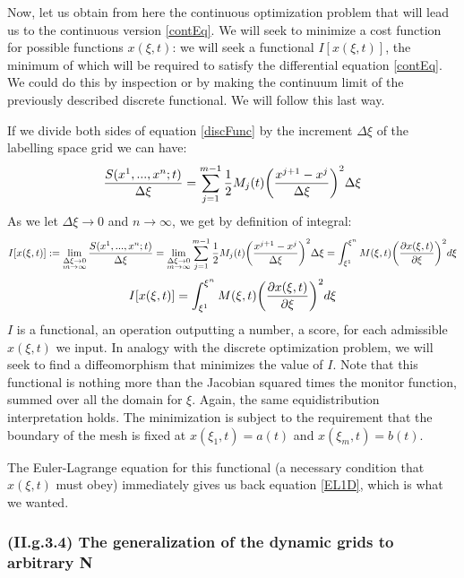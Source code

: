 \documentclass[11pt, a4paper]{article} %
\begin{document}
Now, let us obtain from here the continuous optimization problem that will lead us to the continuous version \eqref{contEq}. We will seek to minimize a cost function for possible functions $x(\xi,t)$: we will seek a functional $I[x(\xi,t)]$, the minimum of which will be required to satisfy the differential equation \eqref{contEq}. We could do this by inspection or by making the continuum limit of the previously described discrete functional. We will follow this last way.

If we divide both sides of equation \eqref{discFunc} by the increment $\Delta \xi$ of the labelling space grid we can have:
\begin{equation}
\frac{S( x^1,...,x^n;t)}{\Delta\xi}=\sum_{j=1}^{m-1} \frac{1}{2} M_j(t) \qty(\frac{x^{j+1}-x^j}{\Delta \xi})^2 \Delta \xi
\end{equation}
As we let $\Delta \xi \rightarrow 0$ and $n\rightarrow \infty$, we get by definition of integral:
\begin{equation}
I[x(\xi,t)]:=\lim\limits_{\substack{\Delta \xi \rightarrow 0\\ m \rightarrow \infty}}\frac{S( x^1,...,x^n;t)}{\Delta\xi}=\lim\limits_{\substack{\Delta \xi \rightarrow 0\\ m \rightarrow \infty}} \sum_{j=1}^{m-1}\frac{1}{2} M_j(t) \qty(\frac{x^{j+1}-x^j}{\Delta \xi})^2 \Delta \xi=\int_{\xi^1}^{\xi^n} M(\xi,t) \qty(\pdv{x(\xi,t)}{\xi})^2d\xi
\end{equation}
\begin{equation}\label{functional1D}
I[x(\xi,t)]=\int_{\xi^1}^{\xi^n} M(\xi,t) \qty(\pdv{x(\xi,t)}{\xi})^2d\xi
\end{equation}
$I$ is a functional, an operation outputting a number, a score, for each admissible $x(\xi,t)$ we input. In analogy with the discrete optimization problem, we will seek to find a diffeomorphism that minimizes the value of $I$. Note that this functional is nothing more than the Jacobian squared times the monitor function, summed over all the domain for $\xi$. Again, the same equidistribution interpretation holds. The minimization is subject to the requirement that the boundary of the mesh is fixed at $x(\xi_1,t)=a(t)$ and $x(\xi_m,t)=b(t)$.

The Euler-Lagrange equation for this functional (a necessary condition that $x(\xi,t)$ must obey) immediately gives us back equation \eqref{EL1D}, which is what we wanted.

\subsubsection*{\bf (II.g.3.4) The generalization of the dynamic grids to arbitrary N}
\end{document}
